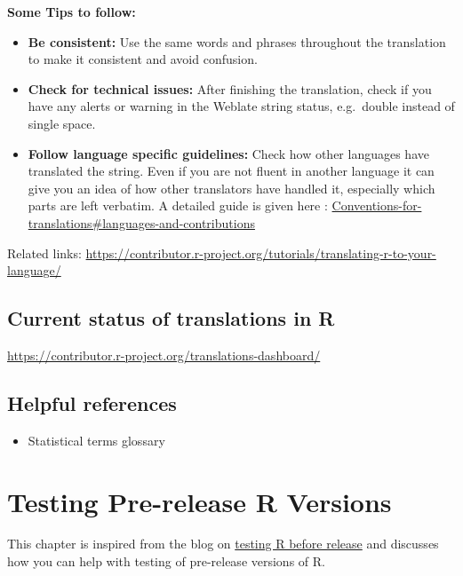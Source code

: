 \documentclass[
]{book}
\providecommand{\tightlist}{%
  \setlength{\itemsep}{0pt}\setlength{\parskip}{0pt}}
\begin{document}
\textbf{Some Tips to follow:}

\begin{itemize}
\item
  \textbf{Be consistent:} Use the same words and phrases throughout the
  translation to make it consistent and avoid confusion.
\item
  \textbf{Check for technical issues:} After finishing the translation,
  check if you have any alerts or warning in the Weblate string
  status, e.g.~double instead of single space.
\item
  \textbf{Follow language specific guidelines:} Check how other languages
  have translated the string. Even if you are not fluent in another
  language it can give you an idea of how other translators have
  handled it, especially which parts are left verbatim. A detailed
  guide is given here :
  \href{https://contributor.r-project.org/translations/Conventions_for_Languages/\#languages-and-contributions}{Conventions-for-translations\#languages-and-contributions}
\end{itemize}

Related links:
\url{https://contributor.r-project.org/tutorials/translating-r-to-your-language/}

\section{Current status of translations in R}\label{current-status-of-translations-in-r}

\url{https://contributor.r-project.org/translations-dashboard/}

\section{Helpful references}\label{helpful-references}

\begin{itemize}
\tightlist
\item
  Statistical terms glossary
\end{itemize}

\chapter{Testing Pre-release R Versions}\label{TestRVer}

This chapter is inspired from the blog on \href{https://blog.r-project.org/2021/04/28/r-can-use-your-help-testing-r-before-release/index.html}{testing R before release} and discusses how you can help with testing of pre-release versions of R.
\end{document}
